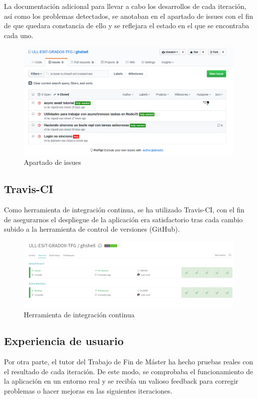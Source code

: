 La documentación adicional para llevar a cabo los desarrollos de cada iteración, así como los problemas detectados, se anotaban en el apartado de issues con el fin de que quedara constancia de ello y se reflejara el estado en el que se encontraba cada uno.

\begin{figure}[H]
\begin{center}
\includegraphics[width=1\textwidth]{images/github3}
\caption{Apartado de issues}
\label{fig:github3}
\end{center}
\end{figure}

\subsection{Travis-CI}
\label{subsec:2.1.2}

Como herramienta de integración continua, se ha utilizado Travis-CI, con el fin de asegurarnos el despliegue de la aplicación era satisfactorio tras cada cambio subido a la herramienta de control de versiones (GitHub).

\begin{figure}[H]
\begin{center}
\includegraphics[width=1.1\textwidth]{images/travis-ci}
\caption{Herramienta de integración continua}
\label{fig:travisci}
\end{center}
\end{figure}

\subsection{Experiencia de usuario}
\label{subsec:2.1.3}

Por otra parte, el tutor del Trabajo de Fin de Máster ha hecho pruebas reales con el resultado de cada iteración. De este modo, se comprobaba el funcionamiento de la aplicación en un entorno real y se recibía un valioso feedback para corregir problemas o hacer mejoras en las siguientes iteraciones.
